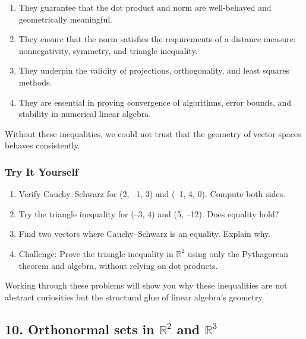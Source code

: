 \documentclass[
  letterpaper,
  DIV=11,
  numbers=noendperiod]{scrreprt}
\providecommand{\tightlist}{%
  \setlength{\itemsep}{0pt}\setlength{\parskip}{0pt}}
\begin{document}
\begin{enumerate}
\def\labelenumi{\arabic{enumi}.}
\tightlist
\item
  They guarantee that the dot product and norm are well-behaved and
  geometrically meaningful.
\item
  They ensure that the norm satisfies the requirements of a distance
  measure: nonnegativity, symmetry, and triangle inequality.
\item
  They underpin the validity of projections, orthogonality, and least
  squares methods.
\item
  They are essential in proving convergence of algorithms, error bounds,
  and stability in numerical linear algebra.
\end{enumerate}

Without these inequalities, we could not trust that the geometry of
vector spaces behaves consistently.

\subsubsection{Try It Yourself}\label{try-it-yourself-8}

\begin{enumerate}
\def\labelenumi{\arabic{enumi}.}
\tightlist
\item
  Verify Cauchy--Schwarz for (2, --1, 3) and (--1, 4, 0). Compute both
  sides.
\item
  Try the triangle inequality for (--3, 4) and (5, --12). Does equality
  hold?
\item
  Find two vectors where Cauchy--Schwarz is an equality. Explain why.
\item
  Challenge: Prove the triangle inequality in \(\mathbb{R}^2\) using
  only the Pythagorean theorem and algebra, without relying on dot
  products.
\end{enumerate}

Working through these problems will show you why these inequalities are
not abstract curiosities but the structural glue of linear algebra's
geometry.

\subsection{\texorpdfstring{10. Orthonormal sets in \(\mathbb{R}^2\) and
\(\mathbb{R}^3\)}{10. Orthonormal sets in \textbackslash mathbb\{R\}\^{}2 and \textbackslash mathbb\{R\}\^{}3}}\label{orthonormal-sets-in-mathbbr2-and-mathbbr3}
\end{document}
